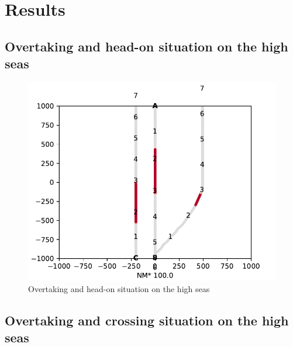 

\chapter{Results}
\section{Overtaking and head-on situation on the high seas}
\begin{figure}[H]
    \centering
    \includegraphics[width=\textwidth,height=0.75\textheight,keepaspectratio]{Figures/Scenario/overtaking-and-head-on-res.pdf}
    \caption{Overtaking and head-on situation on the high seas }
    \label{fig:overtaking-and-head-on}
\end{figure}
\section{Overtaking and crossing situation on the high seas}

